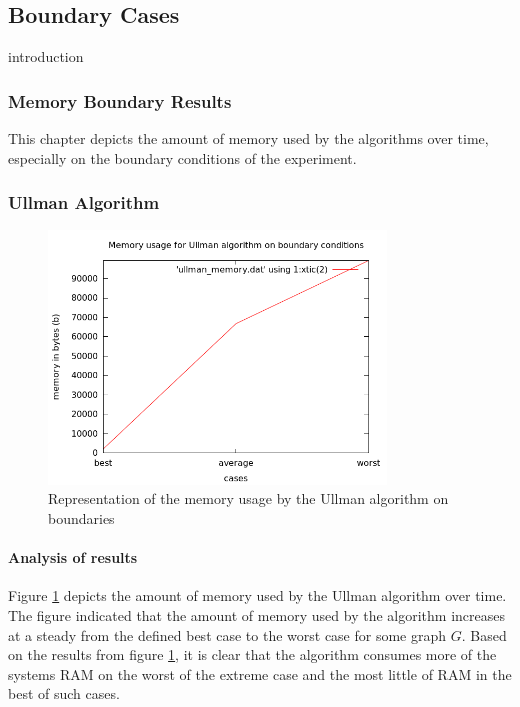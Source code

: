 \subsection{Boundary Cases}
\label{Boundary Cases}

{introduction}

\subsubsection{Memory Boundary Results}
\label{Memory Boundary Results}
This chapter depicts the amount of memory used by the algorithms over time, especially on the boundary conditions of the experiment.

\subsubsection{Ullman Algorithm}
\begin{figure}[H]
  \begin{center}
      \includegraphics[width=0.8\textwidth]{ullman_memory.png}
  \end{center}    
  \caption{Representation of the memory usage by the Ullman algorithm on boundaries}
  \label{fig:case_ullman_memory}
\end{figure} 

\paragraph{Analysis of results}
Figure \ref{fig:case_ullman_memory} depicts the amount of memory used by the Ullman algorithm over time. The figure indicated that the amount of memory used
by the algorithm increases at a steady from the defined best case to the worst case for some graph $G$.\newline\newline
Based on the results from figure \ref{fig:case_ullman_memory}, it is clear that the algorithm consumes more of the systems RAM on the worst of the extreme case
and the most little of RAM in the best of such cases.

